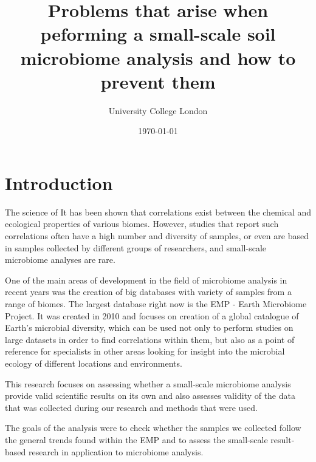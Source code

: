 \documentclass[12pt,twocolumn]{article} %
\title{Problems that arise when peforming a small-scale soil microbiome analysis and how to prevent them}
\author{\normalsize University College London \\}
\date{\today}
\begin{document}
	
\maketitle
%
%
\section{Introduction}
The science of  It has been shown that correlations exist between the chemical and ecological properties of various biomes\cite{Thompson2017,Zhalnina2014,Martins2013}. However, studies that report such correlations often have a high number and diversity of samples, or even are based in samples collected by different groups of researchers, and small-scale microbiome analyses are rare.
\par
One of the main areas of development in the field of microbiome analysis in recent years was the creation of big databases with variety of samples from a range of biomes. The largest database right now is the EMP - Earth Microbiome Project\cite{Gilbert2014}. It was created in 2010 and focuses on creation of a global catalogue of Earth's microbial diversity, which can be used not only to perform studies on large datasets in order to find correlations within them, but also as a point of reference for specialists in other areas looking for insight into the microbial ecology of different locations and environments.
\par
This research focuses on assessing whether a small-scale microbiome analysis provide valid scientific results on its own and also assesses validity of the data that was collected during our research and methods that were used. 
\par
The goals of the analysis were to check whether the samples we collected follow the general trends found within the EMP and to assess the small-scale result-based research in application to microbiome analysis.
%
%
\end{document}

